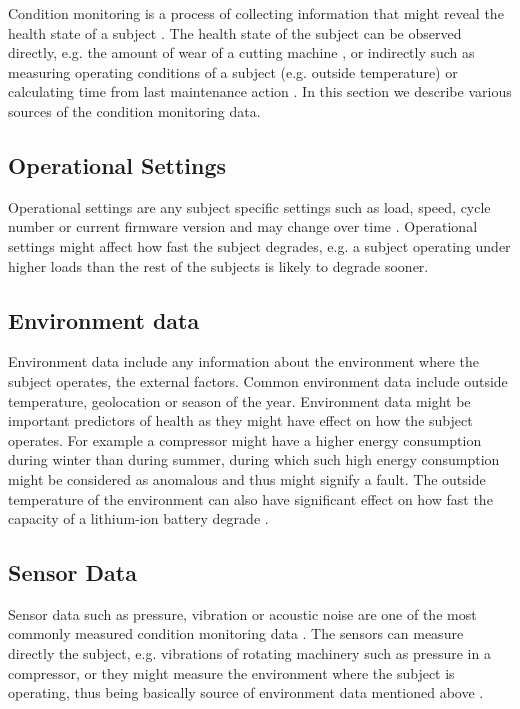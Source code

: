 Condition monitoring is a process of collecting information that might reveal the health state of a subject \cite{wang2017new}.
The health state of the subject can be observed directly, e.g. the amount of wear of a cutting machine \cite{data_set_milling}, or indirectly such as measuring operating conditions of a subject (e.g. outside temperature) or calculating time from last maintenance action \cite{data_set_azure_ai_gallery}.
In this section we describe various sources of the condition monitoring data.

\subsection{Operational Settings}
Operational settings are any subject specific settings such as load, speed, cycle number or current firmware version and may change over time \cite{data_set_turbofan}.
Operational settings might affect how fast the subject degrades, e.g. a subject operating under higher loads than the rest of the subjects is likely to degrade sooner.

\subsection{Environment data}
Environment data include any information about the environment where the subject operates, the external factors.
Common environment data include outside temperature, geolocation or season of the year.
Environment data might be important predictors of health as they might have effect on how the subject operates.
For example a compressor might have a higher energy consumption during winter than during summer, during which such high energy consumption might be considered as anomalous and thus might signify a fault.
The outside temperature of the environment can also have significant effect on how fast the capacity of a lithium-ion battery degrade \cite{ma2018temperature}.

\subsection{Sensor Data}

Sensor data such as pressure, vibration or acoustic noise are one of the most commonly measured condition monitoring data \cite{ran2019survey}.
The sensors can measure directly the subject, e.g. vibrations of rotating machinery such as pressure in a compressor, or they might measure the environment where the subject is operating, thus being basically source of environment data mentioned above \cite{bilosova2012vibration}.

